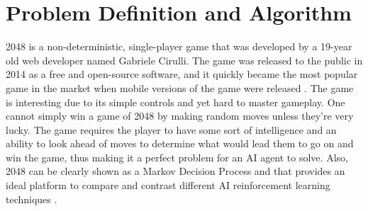 \documentclass{svproc}
\begin{document}
    \section{Problem Definition and Algorithm}
   
	 
	2048 is a non-deterministic, single-player game that was developed by a 19-year old web developer named Gabriele Cirulli. The game was released to the public in 2014 as a free and open-source software, and it quickly became the most popular game in the market when mobile versions of the game were released \cite{wiki_2048}. The game is interesting due to its simple controls and yet hard to master gameplay. One cannot simply win a game of 2048 by making random moves unless they’re very lucky. The game requires the player to have some sort of intelligence and an ability to look ahead of moves to determine what would lead them to go on and win the game, thus making it a perfect problem for an AI agent to solve. Also, 2048 can be clearly shown as a Markov Decision Process and that provides an ideal platform to compare and contrast different AI reinforcement learning techniques \cite{jaskowski, pedagogy}.
\end{document}
